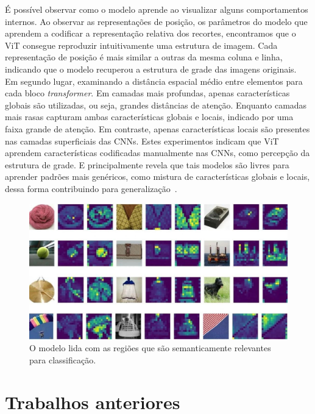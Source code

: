 É possível observar como o modelo aprende ao visualizar alguns comportamentos internos. Ao observar as representações de posição, os parâmetros do modelo que aprendem a codificar a representação relativa dos recortes, encontramos que o ViT consegue reproduzir intuitivamente uma estrutura de imagem. Cada representação de posição é mais similar a outras da mesma coluna e linha, indicando que o modelo recuperou a estrutura de grade das imagens originais. Em segundo lugar, examinando a distância espacial médio entre elementos para cada bloco \textit{transformer}. Em camadas mais profundas, apenas características globais são utilizadas, ou seja, grandes distâncias de atenção. Enquanto camadas mais rasas capturam ambas características globais e locais, indicado por uma faixa grande de atenção. Em contraste, apenas características locais são presentes nas camadas superficiais das CNNs. Estes experimentos indicam que ViT aprendem características codificadas manualmente nas CNNs, como percepção da estrutura de grade. E principalmente revela que tais modelos são livres para aprender padrões mais genéricos, como mistura de características globais e locais, dessa forma contribuindo para generalização~\cite{dosovitskiy2020image}.
 

\begin{figure}[!ht]
    \centering
    \includegraphics[width=\columnwidth]{
        Imagens/visualizing-attention-vit.jpg
    }
    \caption{
O modelo lida com as regiões que são semanticamente relevantes para classificação. \cite{ViTvsResNets}
        }
    \label{fig:ViTVisualizationAttention}
\end{figure}



\section{Trabalhos anteriores}\label{sec:Cap2_revisao_literatura}

